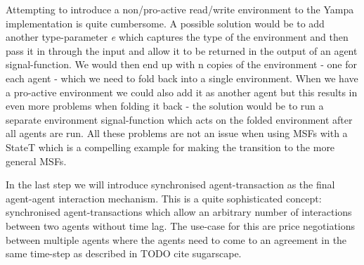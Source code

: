 Attempting to introduce a non/pro-active read/write environment to the Yampa implementation is quite cumbersome. A possible solution would be to add another type-parameter \textit{e} which captures the type of the environment and then pass it in through the input and allow it to be returned in the output of an agent signal-function. We would then end up with n copies of the environment - one for each agent - which we need to fold back into a single environment. When we have a pro-active environment we could also add it as another agent but this results in even more problems when folding it back - the solution would be to run a separate environment signal-function which acts on the folded environment after all agents are run. All these problems are not an issue when using MSFs with a StateT which is a compelling example for making the transition to the more general MSFs.

In the last step we will introduce synchronised agent-transaction as the final agent-agent interaction mechanism. This is a quite sophisticated concept: synchronised agent-transactions which allow an arbitrary number of interactions between two agents without time lag. The use-case for this are price negotiations between multiple agents where the agents need to come to an agreement in the same time-step as described in TODO cite sugarscape.